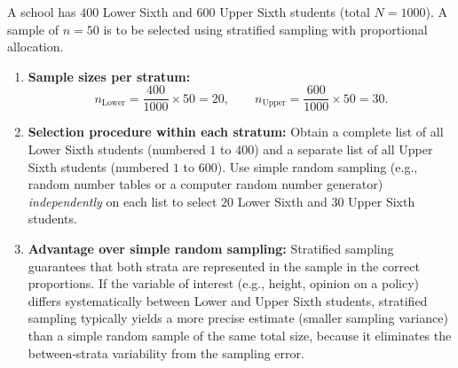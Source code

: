 \documentclass[11pt]{article}
\begin{document}
\begin{corrige}
A school has \(400\) Lower Sixth and \(600\) Upper Sixth students (total \(N=1000\)). A sample of \(n=50\) is to be selected using stratified sampling with proportional allocation.

\begin{enumerate}
\item \textbf{Sample sizes per stratum:}
\[
n_{\text{Lower}} = \frac{400}{1000} \times 50 = 20,\qquad
n_{\text{Upper}} = \frac{600}{1000} \times 50 = 30.
\]

\item \textbf{Selection procedure within each stratum:}
Obtain a complete list of all Lower Sixth students (numbered \(1\) to \(400\)) and a separate list of all Upper Sixth students (numbered \(1\) to \(600\)). Use simple random sampling (e.g., random number tables or a computer random number generator) \emph{independently} on each list to select \(20\) Lower Sixth and \(30\) Upper Sixth students.

\item \textbf{Advantage over simple random sampling:}
Stratified sampling guarantees that both strata are represented in the sample in the correct proportions. If the variable of interest (e.g., height, opinion on a policy) differs systematically between Lower and Upper Sixth students, stratified sampling typically yields a more precise estimate (smaller sampling variance) than a simple random sample of the same total size, because it eliminates the between‑strata variability from the sampling error.
\end{enumerate}
\end{corrige}
\end{document}
